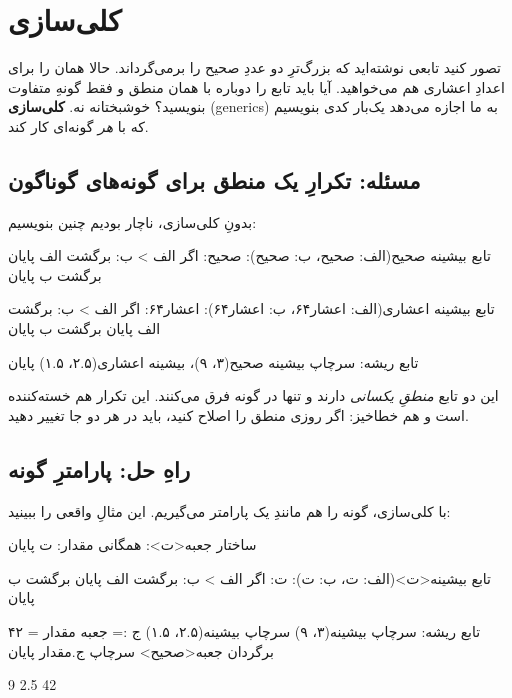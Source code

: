 \chapter{کلی‌سازی}%
\label{ch:generics}

تصور کنید تابعی نوشته‌اید که بزرگ‌ترِ دو عددِ صحیح را برمی‌گرداند. حالا همان را
برای اعدادِ اعشاری هم می‌خواهید. آیا باید تابع را دوباره با همان منطق و فقط
گونهِ متفاوت بنویسید؟ خوشبختانه نه. \textbf{کلی‌سازی} (generics) به ما اجازه
می‌دهد یک‌بار کدی بنویسیم که با \emph{هر} گونه‌ای کار کند.

\section{مسئله: تکرارِ یک منطق برای گونه‌های گوناگون}

بدونِ کلی‌سازی، ناچار بودیم چنین بنویسیم:

\begin{salamfa}
تابع بیشینه صحیح(الف: صحیح، ب: صحیح): صحیح:
    اگر الف > ب: برگشت الف پایان
    برگشت ب
پایان

تابع بیشینه اعشاری(الف: اعشار۶۴، ب: اعشار۶۴): اعشار۶۴:
    اگر الف > ب: برگشت الف پایان
    برگشت ب
پایان

تابع ریشه:
    سرچاپ بیشینه صحیح(۳، ۹)، بیشینه اعشاری(۲.۵، ۱.۵)
پایان
\end{salamfa}

این دو تابع \emph{منطقِ یکسانی} دارند و تنها در گونه فرق می‌کنند. این تکرار هم
خسته‌کننده است و هم خطاخیز: اگر روزی منطق را اصلاح کنید، باید در هر دو جا تغییر
دهید.

\section{راهِ حل: پارامترِ گونه}

با کلی‌سازی، گونه را هم مانندِ یک پارامتر می‌گیریم. این مثالِ واقعی را ببینید:

\begin{salamfa}
ساختار جعبه<ت>:
    همگانی مقدار: ت
پایان

تابع بیشینه<ت>(الف: ت، ب: ت): ت:
    اگر الف > ب:
        برگشت الف
    پایان
    برگشت ب
پایان

تابع ریشه:
    سرچاپ بیشینه(۳، ۹)
    سرچاپ بیشینه(۲.۵، ۱.۵)
    ج := جعبه { مقدار = ۴۲ } برگردان جعبه<صحیح>
    سرچاپ ج.مقدار
پایان
\end{salamfa}

\begin{progoutfa}
9
2.5
42
\end{progoutfa}

